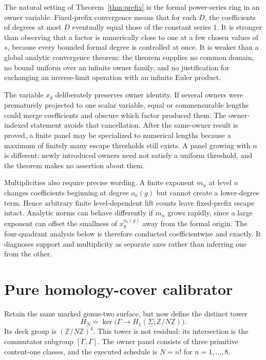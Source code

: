 \documentclass[11pt]{article}
\theoremstyle{definition}
\theoremstyle{remark}
\newcommand{\ZZ}{\mathbb Z}
\begin{document}
The natural setting of Theorem~\ref{thm:prefix} is the formal power-series ring in an owner variable. Fixed-prefix convergence means that for each $D$, the coefficients of degrees at most $D$ eventually equal those of the constant series $1$. It is stronger than observing that a factor is numerically close to one at a few chosen values of $s$, because every bounded formal degree is controlled at once. It is weaker than a global analytic convergence theorem: the theorem supplies no common domain, no bound uniform over an infinite owner family, and no justification for exchanging an inverse-limit operation with an infinite Euler product.

The variable $x_g$ deliberately preserves owner identity. If several owners were prematurely projected to one scalar variable, equal or commensurable lengths could merge coefficients and obscure which factor produced them. The owner-indexed statement avoids that cancellation. After the same-owner result is proved, a finite panel may be specialized to numerical lengths because a maximum of finitely many escape thresholds still exists. A panel growing with $n$ is different: newly introduced owners need not satisfy a uniform threshold, and the theorem makes no assertion about them.

Multiplicities also require precise wording. A finite exponent $m_n$ at level $n$ changes coefficients beginning at degree $o_n(g)$ but cannot create a lower-degree term. Hence arbitrary finite level-dependent lift counts leave fixed-prefix escape intact. Analytic norms can behave differently if $m_n$ grows rapidly, since a large exponent can offset the smallness of $x_g^{o_n(g)}$ away from the formal origin. The four-quadrant analysis below is therefore conducted coefficientwise and exactly. It diagnoses support and multiplicity as separate axes rather than inferring one from the other.

\section{Pure homology-cover calibrator}

Retain the same marked genus-two surface, but now define the distinct tower
\[
H_N=\ker\bigl(\Gamma\to H_1(\Sigma;\ZZ/N\ZZ)\bigr).
\]
Its deck group is $(\ZZ/N\ZZ)^4$. This tower is not residual: its intersection is the commutator subgroup $[\Gamma,\Gamma]$. The owner panel consists of three primitive content-one classes, and the executed schedule is $N=n!$ for $n=1,\ldots,8$.
\end{document}
